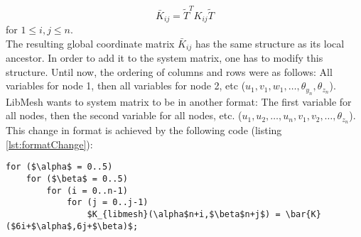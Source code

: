    \begin{equation*}
   \bar{K}_{ij} = \tilde{T}^T K_{ij} \tilde{T}
   \end{equation*}
   for $1 \leq i,j \leq n$.\\
   The resulting global coordinate matrix $\bar{K}_{ij}$ has the same structure as its local ancestor. In order to add it to the system matrix, one has to modify this structure. Until now, the ordering of columns and rows were as follows: All variables for node 1, then all variables for node 2, etc ($u_1, v_1, w_1, \ldots, \theta_{y_n}, \theta_{z_n}$). LibMesh wants to system matrix to be in another format: The first variable for all nodes, then the second variable for all nodes, etc. ($u_1, u_2, \ldots, u_n, v_1, v_2, \ldots, \theta_{z_n}$). This change in format is achieved by the following code (listing \ref{lst:formatChange}):
\begin{lstlisting}[caption=Bring stiffness matrix into libMesh conform format,label=lst:formatChange,mathescape,numbers=none]
for ($\alpha$ = 0..5)
	for ($\beta$ = 0..5)
		for (i = 0..n-1)
			for (j = 0..j-1)
				$K_{libmesh}(\alpha$n+i,$\beta$n+j$) = \bar{K}($6i+$\alpha$,6j+$\beta)$;
\end{lstlisting}


